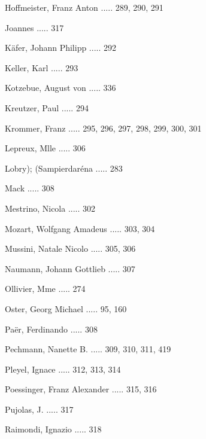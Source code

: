 \documentclass[twocolumn]{book}
\begin{document}
\newline 
Hoffmeister, Franz Anton ..... 289, 290, 291

\newline 
Joannes ..... 317

\newline 
Käfer, Johann Philipp ..... 292

\newline 
Keller, Karl ..... 293

\newline 
Kotzebue, August von ..... 336

\newline 
Kreutzer, Paul ..... 294

\newline 
Krommer, Franz ..... 295, 296, 297, 298, 299, 300, 301

\newline 
Lepreux, Mlle ..... 306

\newline 
Lobry); (Sampierdaréna ..... 283

\newline 
Mack ..... 308

\newline 
Mestrino, Nicola ..... 302

\newline 
Mozart, Wolfgang Amadeus ..... 303, 304

\newline 
Mussini, Natale Nicolo ..... 305, 306

\newline 
Naumann, Johann Gottlieb ..... 307

\newline 
Ollivier, Mme ..... 274

\newline 
Oster, Georg Michael ..... 95, 160

\newline 
Paër, Ferdinando ..... 308

\newline 
Pechmann, Nanette B. ..... 309, 310, 311, 419

\newline 
Pleyel, Ignace ..... 312, 313, 314

\newline 
Poessinger, Franz Alexander ..... 315, 316

\newline 
Pujolas, J. ..... 317

\newline 
Raimondi, Ignazio ..... 318
\end{document}
